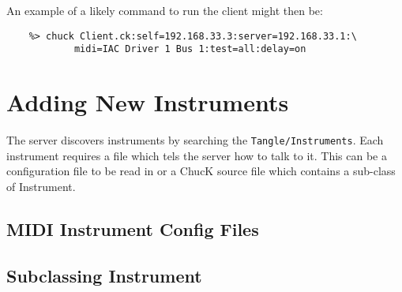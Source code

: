 \documentclass[11pt]{article}
\begin{document}
An example of a likely command to run the client might then be:
\begin{verbatim}
	%> chuck Client.ck:self=192.168.33.3:server=192.168.33.1:\
			midi=IAC Driver 1 Bus 1:test=all:delay=on
\end{verbatim}

\section{Adding New Instruments}
The server discovers instruments by searching the \texttt{Tangle/Instruments}. Each instrument requires a file which tels the server how to talk to it. This can be a 
configuration file to be read in or a ChucK source file which contains a sub-class of Instrument.

\subsection{MIDI Instrument Config Files}


\subsection{Subclassing Instrument}
\end{document}
